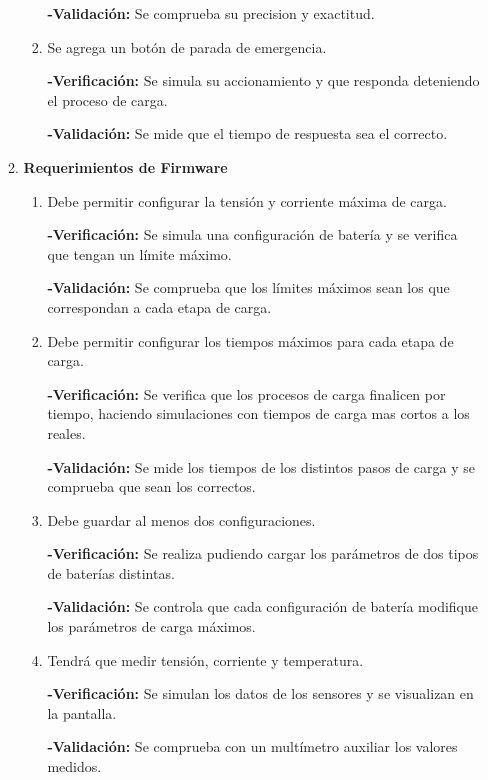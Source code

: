\documentclass[11pt]{charter}
\begin{document}
\begin{enumerate}
\begin{enumerate}[label*=\arabic*.]
\begin{enumerate}[label*=\arabic*.]
				\textbf{-Validación:} Se comprueba su precision y exactitud.
				
				\item Se agrega un botón de parada de emergencia.
				
				\textbf{-Verificación:} Se simula su accionamiento y que responda deteniendo el proceso de carga.
		
				\textbf{-Validación:} Se mide que el tiempo de respuesta sea el correcto.
							
			\end{enumerate}
		\item \textbf{Requerimientos de Firmware}
			\begin{enumerate}[label*=\arabic*.]
				\item Debe permitir configurar la tensión y corriente máxima de carga.
				
				\textbf{-Verificación:} Se simula una configuración de batería y se  verifica que tengan un límite máximo.
		
				\textbf{-Validación:} Se comprueba que los límites máximos sean los que correspondan a cada etapa de carga.
				
				\item Debe permitir configurar los tiempos máximos para cada etapa de carga.
							
				\textbf{-Verificación:} Se verifica que los procesos de carga finalicen por tiempo, haciendo simulaciones con tiempos de carga mas cortos a los reales.
		
				\textbf{-Validación:} Se mide los tiempos de los distintos pasos de carga y se comprueba que sean los correctos.
				
				\item Debe guardar al menos dos configuraciones.
				
				
				\textbf{-Verificación:} Se realiza pudiendo cargar los parámetros de dos tipos de baterías distintas.
		
				\textbf{-Validación:} Se controla que cada configuración de batería modifique los parámetros de carga máximos. 
				
				\item Tendrá que medir tensión, corriente y temperatura.
				
				
				\textbf{-Verificación:} Se simulan los datos de los sensores y se visualizan en la pantalla.
		
				\textbf{-Validación:} Se comprueba con un multímetro auxiliar los valores medidos.
				

\end{enumerate}
\end{enumerate}
\end{enumerate}
\end{document}
